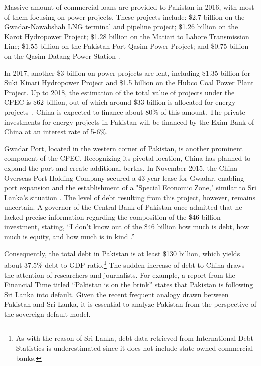 Massive amount of commercial loans are provided to Pakistan in 2016, with most of them focusing on power projects.
These projects include:
\$2.7 billion on the Gwadar-Nawabshah LNG terminal and pipeline project;
\$1.26 billion on the Karot Hydropower Project;
\$1.28 billion on the Matiari to Lahore Transmission Line;
\$1.55 billion on the Pakistan Port Qasim Power Project; and \$0.75 billion on the Qasim Datang Power Station \citep*{Horn-Reinhart-Trebesch-21}.

In 2017, another \$3 billion on power projects are lent, including \$1.35 billion for Suki Kinari Hydropower Project and \$1.5 billion on the Hubco Coal Power Plant Project.
Up to 2018, the estimation of the total value of projects under the CPEC is \$62 billion, out of which around \$33 billion is allocated for energy projects~\citep*{Hurley19-8-debt-trap}. China is expected to finance about 80\% of this amount. The private investments for energy projects in Pakistan will be financed by the Exim Bank of China at an interest rate of 5-6\%.

Gwadar Port, located in the western corner of Pakistan, is another prominent component of the CPEC.
Recognizing its pivotal location, China has planned to expand the port and create additional berths. In November 2015, the China Overseas Port Holding Company secured a 43-year lease for Gwadar, enabling port expansion and the establishment of a "Special Economic Zone," similar to Sri Lanka's situation \citep{Ranade-17-CPEC}.
The level of debt resulting from this project, however, remains uncertain. A governor of the Central Bank of Pakistan once admitted that he lacked precise information regarding the composition of the \$46 billion investment, stating, ``I don't know out of the \$46 billion how much is debt, how much is equity, and how much is in kind \citep{small2020returning}.''

Consequently, the total debt in Pakistan is at least \$130 billion, which yields about 37.5\% debt-to-GDP ratio.\footnote{
    As with the reason of Sri Lanka, debt data retrieved from International Debt Statistics is underestimated since it does not include state-owned commercial banks.
}
The sudden increase of debt to China draws the attention of researchers and journalists. For example, a report from the Financial Time titled ``Pakistan is on the brink'' states that Pakistan is following Sri Lanka into default.
Given the recent frequent analogy drawn between Pakistan and Sri Lanka, it is essential to analyze Pakistan from the perspective of the sovereign default model.
